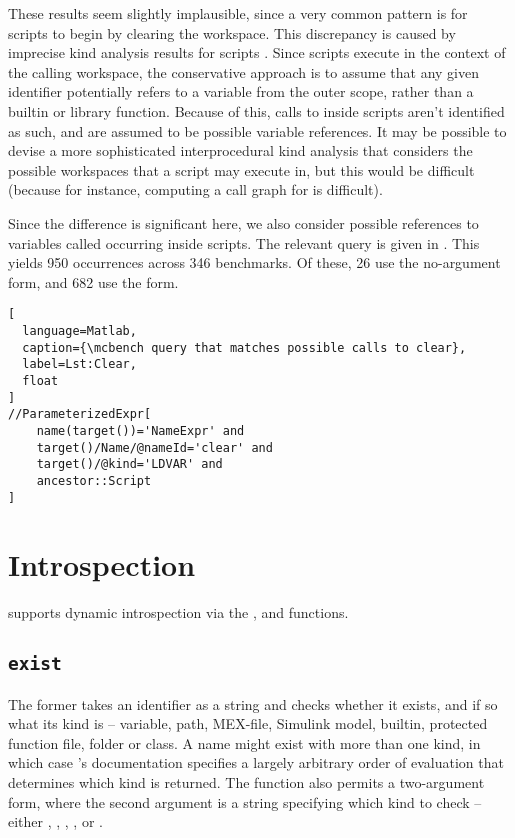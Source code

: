 
These results seem slightly implausible, since a very common pattern is for
\matlab scripts to begin by clearing the workspace. This discrepancy is caused
by imprecise kind analysis results for scripts \cite{KindAnalysis}. Since
scripts execute in the context of the calling workspace, the conservative
approach is to assume that any given identifier potentially refers to a
variable from the outer scope, rather than a builtin or library function.
Because of this, calls to  inside scripts aren't identified as
such, and are assumed to be possible variable references. It may be possible to
devise a more sophisticated interprocedural kind analysis that considers the
possible workspaces that a script may execute in, but this would be difficult
(because for instance, computing a call graph for \matlab is difficult).

Since the difference is significant here, we also consider possible references
to variables called  occurring inside scripts. The relevant query
is given in . This yields 950 occurrences across
346 benchmarks. Of these, 26 use the no-argument form, and 682 use the
 form.

\begin{lstlisting}[
  language=Matlab,
  caption={\mcbench query that matches possible calls to clear},
  label=Lst:Clear,
  float
]
//ParameterizedExpr[
    name(target())='NameExpr' and
    target()/Name/@nameId='clear' and
    target()/@kind='LDVAR' and
    ancestor::Script
]
\end{lstlisting}

\section{Introspection}

\matlab supports dynamic introspection via the ,  and
 functions.

\subsection{\texttt{exist}}

The former takes an identifier as a string and checks whether it exists, and if
so what its kind is -- variable, path, MEX-file, Simulink model, builtin,
protected function file, folder or class. A name might exist with more than one
kind, in which case \matlab's documentation specifies a largely arbitrary order
of evaluation that determines which kind is returned. The function also permits
a two-argument form, where the second argument is a string specifying which
kind to check -- either , , ,
, or .

